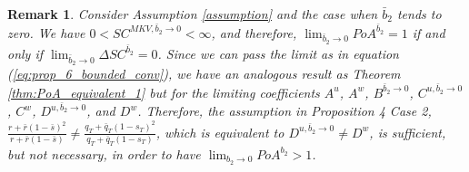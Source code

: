 \documentclass[11pt]{article}
\newtheorem{remark}{Remark}
\begin{document}
\begin{remark}
	Consider Assumption \ref{assumption} and the case when $\bar{b}_2$ tends to zero. We have $0< SC^{MKV, \bar{b}_2 \to 0} < \infty$, and therefore, $\lim_{\bar{b}_2 \to 0} PoA^{\bar{b}_2 } =1$ if and only if $\lim_{\bar{b}_2 \to 0} \Delta SC^{\bar{b}_2} = 0$. Since we can pass the limit as in equation (\ref{eq:prop_6_bounded_conv}), we have an analogous result as Theorem \ref{thm:PoA_equivalent_1} but for the limiting coefficients $A^u$, $A^w$, $B^{\bar{b}_2 \to 0}$, $C^{u,\bar{b}_2 \to 0}$, $C^w$, $D^{u,\bar{b}_2 \to 0}$, and $D^w$. Therefore, the assumption in Proposition 4 Case 2, $\frac{r + \bar{r}(1- \bar{s})^2}{r + \bar{r}(1-\bar{s})} \neq \frac{q_T+\bar{q}_T(1-s_T)^2}{q_T+\bar{q}_T(1-s_T)}$, which is equivalent to $D^{u,\bar{b}_2 \to 0} \neq D^w$, is sufficient, but not necessary, in order to have $\lim_{b_2 \to 0}PoA^{b_2}>1$. 
	

\label{remark_6}
\end{remark}
\end{document}

